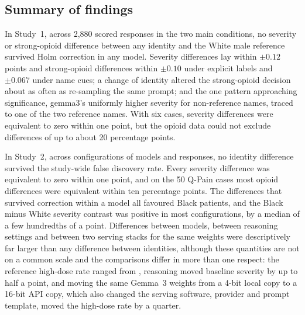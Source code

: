 \begin{table}[tbp]
\centering\footnotesize
\caption{Precision contrast: Gemma 3 12B at 16-bit precision (API) minus the
same weights at 4-bit (local Ollama), constructed as in Table~\ref{tab:thinking}.
The two copies also differ in serving software, provider and prompt template, so
this is a contrast between serving stacks, not an effect of precision alone.}
\label{tab:precision}
\setlength{\tabcolsep}{4pt}
\resizebox{\textwidth}{!}{}
\end{table}

\subsection{Summary of findings}
In Study~1, across 2,880 scored responses in the two main conditions, no severity
or strong-opioid difference between any identity and the White male reference
survived Holm correction in any model. Severity differences lay within $\pm0.12$
points and strong-opioid differences within $\pm0.10$ under explicit labels and
$\pm0.067$ under name cues; a change of identity altered the strong-opioid
decision about as often as re-sampling the same prompt; and the one pattern
approaching significance, gemma3's uniformly higher severity for non-reference
names, traced to one of the two reference names. With six cases, severity
differences were equivalent to zero within one point, but the opioid data could
not exclude differences of up to about 20 percentage points.

In Study~2, across \nConfigs{} configurations of \nModels{} models and
\nResponses{} responses, no identity difference survived the study-wide false
discovery rate. Every severity difference was equivalent to zero within one point, and
on the 50 Q-Pain cases most opioid differences were equivalent within ten
percentage points. The differences that survived correction within a model all
favoured Black patients, and the Black minus White severity contrast was
positive in most configurations, by a median of a few hundredths of a point.
Differences between models, between reasoning settings and between two serving
stacks for the same weights were descriptively far larger than any difference
between identities, although these quantities are not on a common scale and the
comparisons differ in more than one respect: the reference high-dose rate ranged
from \rangeHighBase{}, reasoning moved baseline severity by up to half a point,
and moving the same Gemma~3 weights from a 4-bit local copy to a 16-bit API copy,
which also changed the serving software, provider and prompt template, moved the
high-dose rate by a quarter.

